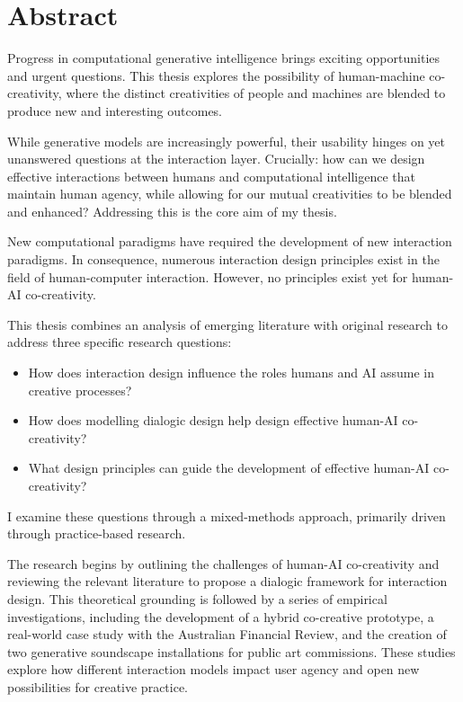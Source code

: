 \chapter{Abstract}

Progress in computational generative intelligence brings exciting opportunities and urgent questions. This thesis explores the possibility of human-machine co-creativity, where the distinct creativities of people and machines are blended to produce new and interesting outcomes.

While generative models are increasingly powerful, their usability hinges on yet unanswered questions at the interaction layer. Crucially: how can we design effective interactions between humans and computational intelligence that maintain human agency, while allowing for our mutual creativities to be blended and enhanced? Addressing this is the core aim of my thesis.

New computational paradigms have required the development of new interaction paradigms. In consequence, numerous interaction design principles exist in the field of human-computer interaction. However, no principles exist yet for human-AI co-creativity.

This thesis combines an analysis of emerging literature with original research to address three specific research questions:

\begin{itemize}
\item How does interaction design influence the roles humans and AI assume in creative processes?
\item How does modelling dialogic design help design effective human-AI co-creativity?
\item What design principles can guide the development of effective human-AI co-creativity?

\end{itemize} I examine these questions through a mixed-methods approach, primarily driven through practice-based research.

The research begins by outlining the challenges of human-AI co-creativity and reviewing the relevant literature to propose a dialogic framework for interaction design. This theoretical grounding is followed by a series of empirical investigations, including the development of a hybrid co-creative prototype, a real-world case study with the Australian Financial Review, and the creation of two generative soundscape installations for public art commissions. These studies explore how different interaction models impact user agency and open new possibilities for creative practice.

